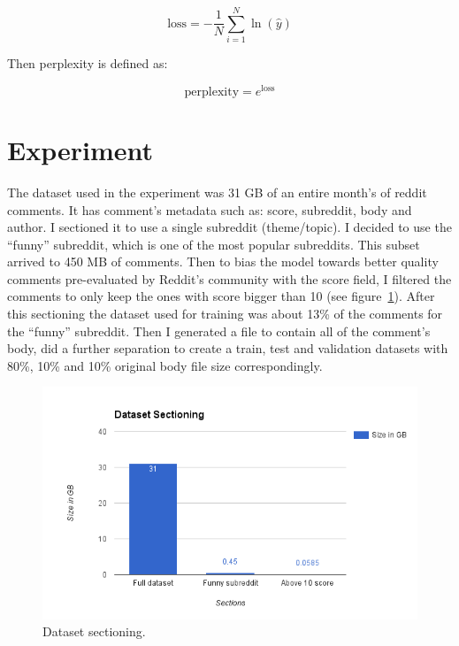 \documentclass{article} %
\begin{document}
\begin{equation}
\textrm{loss} = -\frac{1}{N}\sum_{i=1}^{N} \ln{(\hat{y})}
\end{equation}

Then perplexity is defined as:

\begin{equation}
\textrm{perplexity} = e^{\textrm{loss}}
\end{equation}


\section{Experiment}
The dataset used in the experiment was 31 GB of an entire month's of reddit
comments. It has comment's metadata such as: score, subreddit, body and author.
I sectioned it to use a single subreddit (theme/topic). I decided to use the
``funny'' subreddit, which is one of the most popular subreddits. This subset
arrived to 450 MB of comments. Then to bias the model towards better quality
comments pre-evaluated by Reddit's community with the score field, I filtered
the comments to only keep the ones with score bigger than 10 (see
figure~\ref{fig:datasetsection}).  After this sectioning the dataset used for
training was about 13\% of the comments for the ``funny'' subreddit. Then I
generated a file to contain all of the comment's body, did a further separation
to create a train, test and validation datasets with 80\%, 10\% and 10\%
original body file size correspondingly.

\begin{figure}[h]
\centering
\includegraphics[scale=0.5]{dataset_sectioning}
\caption{Dataset sectioning.}
\label{fig:datasetsection}
\end{figure}
\end{document}
